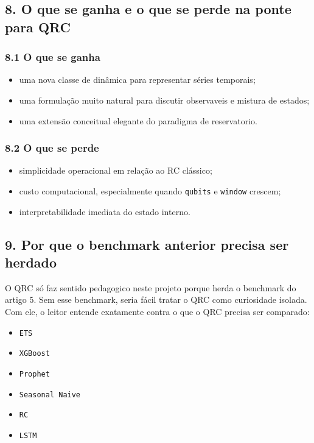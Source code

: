 \documentclass[12pt]{article}
\providecommand{\tightlist}{%
          \setlength{\itemsep}{0pt}\setlength{\parskip}{0pt}}
\begin{document}
\subsection{8. O que se ganha e o que se perde na ponte para QRC}\label{8-o-que-se-ganha-e-o-que-se-perde-na-ponte-para-qrc}

\subsubsection{8.1 O que se ganha}\label{81-o-que-se-ganha}

\begin{itemize}
\tightlist
\item
  uma nova classe de dinâmica para representar séries temporais;
\item
  uma formulação muito natural para discutir observaveis e mistura de estados;
\item
  uma extensão conceitual elegante do paradigma de reservatorio.
\end{itemize}

\subsubsection{8.2 O que se perde}\label{82-o-que-se-perde}

\begin{itemize}
\tightlist
\item
  simplicidade operacional em relação ao RC clássico;
\item
  custo computacional, especialmente quando \texttt{qubits} e \texttt{window} crescem;
\item
  interpretabilidade imediata do estado interno.
\end{itemize}

\subsection{9. Por que o benchmark anterior precisa ser herdado}\label{9-por-que-o-benchmark-anterior-precisa-ser-herdado}

O QRC só faz sentido pedagogico neste projeto porque herda o benchmark do artigo 5. Sem esse benchmark, seria fácil tratar o QRC como curiosidade isolada. Com ele, o leitor entende exatamente contra o que o QRC precisa ser comparado:

\begin{itemize}
\tightlist
\item
  \texttt{ETS}
\item
  \texttt{XGBoost}
\item
  \texttt{Prophet}
\item
  \texttt{Seasonal\ Naive}
\item
  \texttt{RC}
\item
  \texttt{LSTM}
\end{itemize}
\end{document}
